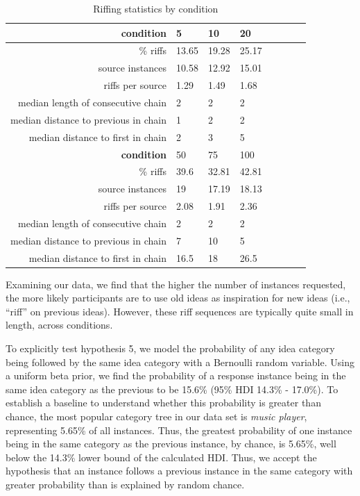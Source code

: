 
\begin{table}
\begin{tabular}[h!]{r | l l l l l l l}
    \hline \hline \textbf{condition} & 5 & 10 & 20  \\ \hline \hline
    \% riffs & 13.65 & 19.28 & 25.17  \\
    source instances & 10.58 & 12.92 & 15.01 \\
    riffs per source & 1.29 & 1.49 & 1.68 \\
    median length of consecutive chain & 2 & 2 & 2 \\
    median distance to previous in chain & 1 & 2 & 2 \\
    median distance to first in chain & 2 & 3 & 5 \\ \hline \hline
    \textbf{condition} & 50 & 75 & 100 \\ \hline \hline
    \% riffs & 39.6 & 32.81 & 42.81 \\
    source instances & 19 & 17.19 & 18.13\\
    riffs per source & 2.08 & 1.91 & 2.36\\
    median length of consecutive chain & 2 & 2 & 2\\
    median distance to previous in chain & 7 & 10 & 5\\
    median distance to first in chain & 16.5 & 18 & 26.5 \\
    \end{tabular}
    \caption{Riffing statistics by condition}
\end{table}

Examining our data, we find that the higher the number of instances requested, the more likely participants are to use old ideas as inspiration for new ideas (i.e., ``riff'' on previous ideas). However, these riff sequences are typically quite small in length, across conditions.

To explicitly test hypothesis 5, we model the probability of any idea category being followed by the same idea category with a Bernoulli random variable. Using a uniform beta prior, we find the probability of a response instance being in the same idea category as the previous to be 15.6\% (95\% HDI 14.3\% - 17.0\%). To establish a baseline to understand whether this probability is greater than chance, the most popular category tree in our data set is \emph{music player}, representing 5.65\% of all instances. Thus, the greatest probability of one instance being in the same category as the previous instance, by chance, is 5.65\%, well below the 14.3\% lower bound of the calculated HDI. Thus, we accept the hypothesis that an instance follows a previous instance in the same category with greater probability than is explained by random chance.

